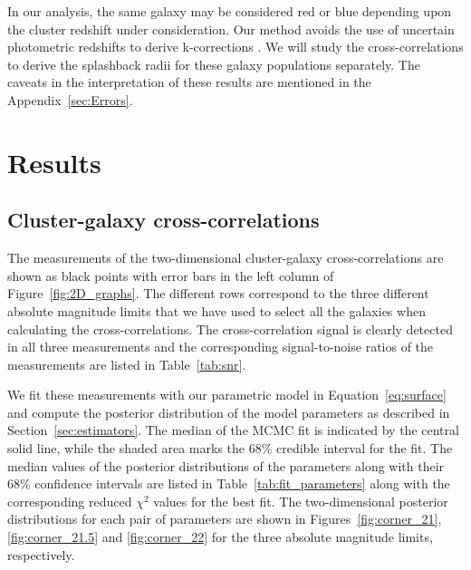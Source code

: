 \documentclass[iop, apjl, twocolappendix, numberedappendix]{emulateapj}
\begin{document}
In our analysis, the same galaxy may be considered red or blue depending upon
the cluster redshift under consideration. Our method avoids the use of
uncertain photometric redshifts to derive k-corrections
\citep[cf.][]{baxter2017halo}. We will study the cross-correlations to derive
the splashback radii for these galaxy populations separately. 
The caveats in the interpretation of these
results are mentioned in the Appendix~\ref{sec:Errors}.

\section{Results}
\label{sec:Results}
\subsection{Cluster-galaxy cross-correlations}
The measurements of the two-dimensional cluster-galaxy
cross-correlations are shown as black points with error bars in the
left column of Figure~\ref{fig:2D_graphs}. The different rows
correspond to the three different absolute magnitude limits that we
have used to select all the galaxies when calculating the
cross-correlations. The cross-correlation signal is clearly detected
in all three measurements and the corresponding signal-to-noise
ratios of the measurements are listed in Table~\ref{tab:snr}.

We fit these measurements with our parametric model in Equation~\ref{eq:surface}
and compute the posterior distribution of the model parameters 
as described in Section~\ref{sec:estimators}. The
median of the MCMC fit is indicated by the central solid line, while
the shaded area marks the 68\% credible interval for the fit. The
median values of the posterior distributions of the parameters along
with their 68\% confidence intervals are listed in
Table~\ref{tab:fit_parameters} along with the corresponding reduced
$\chi^2$ values for the best fit. The two-dimensional posterior
distributions for each pair of parameters are shown in
Figures~\ref{fig:corner_21}, \ref{fig:corner_21.5} and
\ref{fig:corner_22} for the three absolute magnitude limits,
respectively.
\end{document}
